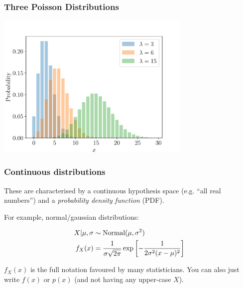 \documentclass{beamer}
\begin{document}
\begin{frame}[t, fragile]
\frametitle{Three Poisson Distributions}

\begin{center}
  \includegraphics[width=0.7\textwidth]{poisson.pdf}
\end{center}

\end{frame}


\begin{frame}[t, fragile]
\frametitle{Continuous distributions}

These are characterised by a continuous hypothesis space (e.g.
``all real numbers'') and a {\em probability density function} (PDF).
\vspace{1em}

For example, normal/gaussian distributions:

\begin{align}
X | \mu, \sigma &\sim \textnormal{Normal}(\mu, \sigma^2) \\
f_X(x) &= \frac{1}{\sigma \sqrt{2\pi}} \exp\left[-\frac{1}{2\sigma^2(x-\mu)^2}\right]
\end{align}

$f_X(x)$ is the full notation favoured by many statisticians.
You can also just write $f(x)$ or $p(x)$ (and not having any upper-case $X$).

\end{frame}
\end{document}
